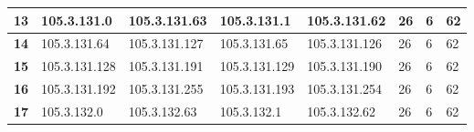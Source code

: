 \begin{table}[H]
\begin{tabular}{@{}|l|l|l|l|l|l|l|l|@{}}
\textbf{13}              & 105.3.131.0                            & 105.3.131.63                                                                        & 105.3.131.1                                                                         & 105.3.131.62                                                                       & 26                                                           & 6                                                              & 62                                                             \\ \midrule
\textbf{14}              & 105.3.131.64                           & 105.3.131.127                                                                       & 105.3.131.65                                                                        & 105.3.131.126                                                                      & 26                                                           & 6                                                              & 62                                                             \\ \midrule
\textbf{15}              & 105.3.131.128                          & 105.3.131.191                                                                       & 105.3.131.129                                                                       & 105.3.131.190                                                                      & 26                                                           & 6                                                              & 62                                                             \\ \midrule
\textbf{16}              & 105.3.131.192                          & 105.3.131.255                                                                       & 105.3.131.193                                                                       & 105.3.131.254                                                                      & 26                                                           & 6                                                              & 62                                                             \\ \midrule
\textbf{17}              & 105.3.132.0                            & 105.3.132.63                                                                        & 105.3.132.1                                                                         & 105.3.132.62                                                                       & 26                                                           & 6                                                              & 62                                                             \\ \midrule

\end{tabular}
\end{table}
